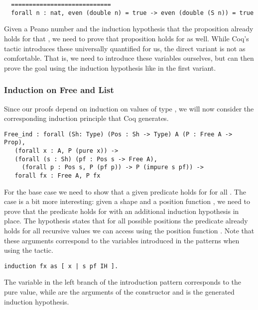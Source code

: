 \begin{verbatim}
  ============================
  forall n : nat, even (double n) = true -> even (double (S n)) = true
\end{verbatim}

Given a Peano number  and the induction hypothesis that the
proposition already holds for that , we need to prove that
proposition holds for  as well.
While Coq's  tactic introduces these universally
quantified for us, the direct variant is not as comfortable.
That is, we need to introduce these variables ourselves, but can then
prove the goal using the induction hypothesis like in the first
variant.

\subsubsection{Induction on Free and List}

Since our proofs depend on induction on values of type , we
will now consider the corresponding induction principle that Coq
generates.

\begin{verbatim}
Free_ind : forall (Sh: Type) (Pos : Sh -> Type) A (P : Free A -> Prop),
   (forall x : A, P (pure x)) ->
   (forall (s : Sh) (pf : Pos s -> Free A),
     (forall p : Pos s, P (pf p)) -> P (impure s pf)) ->
   forall fx : Free A, P fx
\end{verbatim}

For the base case we need to show that a given predicate 
holds for  for all .
The  case is a bit more interesting: given a shape
 and a position function , we need to prove that the
predicate holds for  with an additional induction
hypothesis in place.
The hypothesis states that for all possible positions  the
predicate already holds for all recursive values we can access using
the position function .
Note that these arguments correspond to the variables introduced in
the patterns when using the  tactic.

\begin{verbatim}
induction fx as [ x | s pf IH ].
\end{verbatim}

The variable  in the left branch of the introduction pattern
corresponds to the pure value, while   are the
arguments of the  constructor and  is the
generated induction hypothesis.

